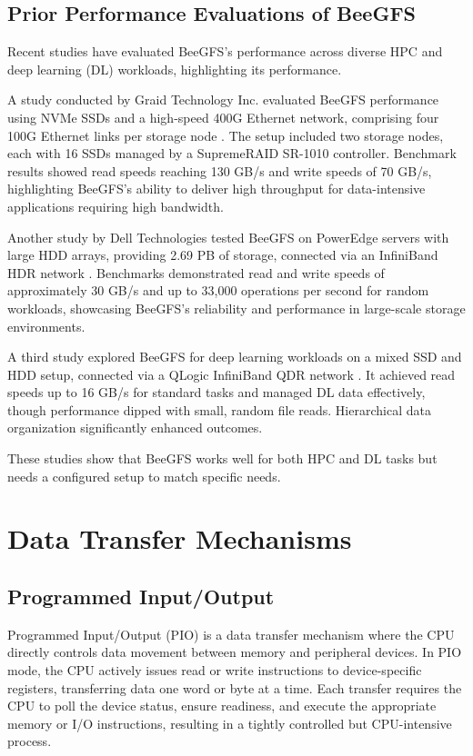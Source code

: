 \subsection{Prior Performance Evaluations of BeeGFS}

Recent studies have evaluated BeeGFS's performance across diverse HPC and deep learning (DL) workloads, highlighting its performance.

A study conducted by Graid Technology Inc. evaluated BeeGFS performance using NVMe SSDs and a high-speed 400G Ethernet network, comprising four 100G Ethernet links per storage node \cite{Graid2023}. The setup included two storage nodes, each with 16 SSDs managed by a SupremeRAID SR-1010 controller. Benchmark results showed read speeds reaching 130 GB/s and write speeds of 70 GB/s, highlighting BeeGFS's ability to deliver high throughput for data-intensive applications requiring high bandwidth.

Another study by Dell Technologies tested BeeGFS on PowerEdge servers with large HDD arrays, providing 2.69 PB of storage, connected via an InfiniBand HDR network \cite{Dell2023}. Benchmarks demonstrated read and write speeds of approximately 30 GB/s and up to 33,000 operations per second for random workloads, showcasing BeeGFS's reliability and performance in large-scale storage environments.

A third study explored BeeGFS for deep learning workloads on a mixed SSD and HDD setup, connected via a QLogic InfiniBand QDR network \cite{Chowdhury2019}. It achieved read speeds up to 16 GB/s for standard tasks and managed DL data effectively, though performance dipped with small, random file reads. Hierarchical data organization significantly enhanced outcomes.

These studies show that BeeGFS works well for both HPC and DL tasks but needs a configured setup to match specific needs.

\section{Data Transfer Mechanisms}

\subsection{Programmed Input/Output}

Programmed Input/Output (PIO) is a data transfer mechanism where the CPU directly controls data movement between memory and peripheral devices. In PIO mode, the CPU actively issues read or write instructions to device-specific registers, transferring data one word or byte at a time. Each transfer requires the CPU to poll the device status, ensure readiness, and execute the appropriate memory or I/O instructions, resulting in a tightly controlled but CPU-intensive process.

